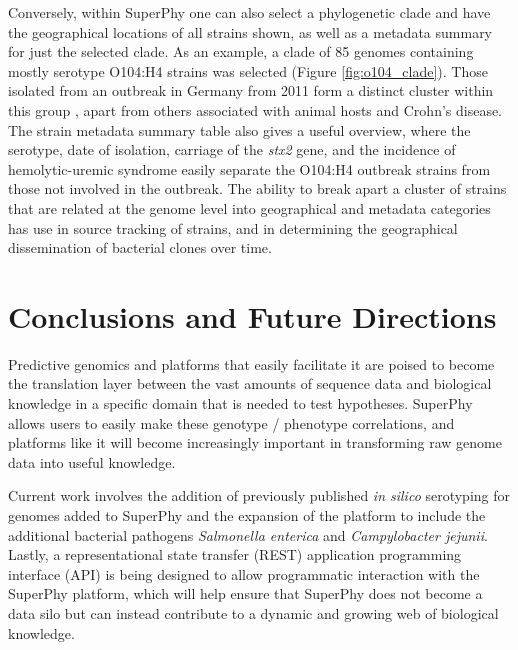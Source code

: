 \documentclass[doublespacing, linenumbers]{bmcart}
\begin{document}
Conversely, within SuperPhy one can also select a phylogenetic clade and have the geographical locations of all strains shown, as well as a metadata summary for just the selected clade. As an example, a clade of 85 genomes containing mostly serotype O104:H4 strains was selected (Figure \ref{fig:o104_clade}). Those isolated from an outbreak in Germany from 2011 form a distinct cluster within this group \cite{mellmann_prospective_2011}, apart from others associated with animal hosts and Crohn's disease. The strain metadata summary table also gives a useful overview, where the serotype, date of isolation, carriage of the \textit{stx2} gene, and the incidence of hemolytic-uremic syndrome easily separate the O104:H4 outbreak strains from those not involved in the outbreak. The ability to break apart a cluster of strains that are related at the genome level into geographical and metadata categories has use in source tracking of strains, and in determining the geographical dissemination of bacterial clones over time.

\section{Conclusions and Future Directions}
Predictive genomics and platforms that easily facilitate it are poised to become the translation layer between the vast amounts of sequence data and biological knowledge in a specific domain that is needed to test hypotheses. SuperPhy allows users to easily make these genotype / phenotype correlations, and platforms like it will become increasingly important in transforming raw genome data into useful knowledge. 

Current work involves the addition of previously published \textit{in silico} serotyping for genomes added to SuperPhy and the expansion of the platform to include the additional bacterial pathogens \textit{Salmonella enterica} and \textit{Campylobacter jejunii}. Lastly, a representational state transfer (REST) application programming interface (API) is being designed to allow programmatic interaction with the SuperPhy platform, which will help ensure that SuperPhy does not become a data silo but can instead contribute to a dynamic and growing web of biological knowledge.
 


\end{document}
